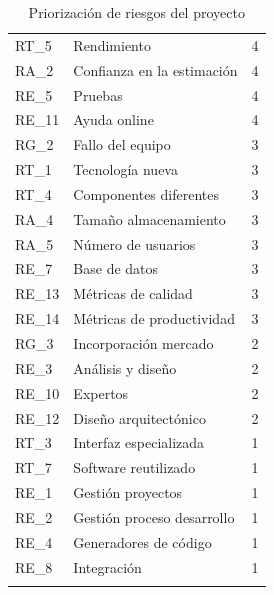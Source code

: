 \begin{enumerate}
\begin{longtable}{l p{5cm} c}
RT\_5 & 
Rendimiento &
4 
 \\
RA\_2 & 
Confianza en la estimación &
4 
 \\
RE\_5 & 
Pruebas &
4 
 \\
RE\_11 & 
Ayuda online &
4 
 \\
RG\_2 & 
Fallo del equipo &
3 
 \\
RT\_1 & 
Tecnología nueva &
3 
 \\
RT\_4 & 
Componentes diferentes &
3 
 \\
RA\_4 & 
Tamaño almacenamiento &
3 
 \\
RA\_5 & 
Número de usuarios &
3 
 \\
RE\_7 & 
Base de datos &
3 
 \\
RE\_13 & 
Métricas de calidad &
3 
 \\
RE\_14 & 
Métricas de productividad &
3 
 \\
RG\_3 & 
Incorporación mercado &
2 
 \\
RE\_3 & 
Análisis y diseño &
2 
 \\
RE\_10 & 
Expertos &
2 
 \\
RE\_12 & 
Diseño arquitectónico &
2 
 \\
RT\_3 & 
Interfaz especializada &
1 
 \\
RT\_7 & 
Software reutilizado &
1 
 \\
RE\_1 & 
Gestión proyectos &
1 
 \\
RE\_2 & 
Gestión proceso desarrollo &
1 
 \\
RE\_4 & 
Generadores de código &
1 
 \\
RE\_8 & 
Integración &
1 
 \\
\hline
\caption{Priorización de riesgos del proyecto}\label{prioriz_riesg}\\
\end{longtable}


\end{enumerate}
